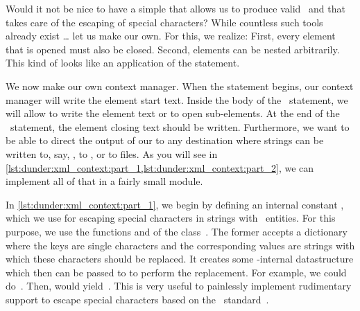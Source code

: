 %
%
%

Would it not be nice to have a simple  that allows us to produce valid~ and that takes care of the escaping of special characters?
While countless such tools already exist {\dots} let us make our own.
For this, we realize:
First, every  element that is opened must also be closed.
Second,  elements can be nested arbitrarily.
This kind of looks like an application of the  statement.

We now make our own context manager.
When the  statement begins, our context manager will write the element start text.
Inside the body of the ~statement, we will allow to write the element text or to open sub-elements.
At the end of the ~statement, the  element closing text should be written.
Furthermore, we want to be able to direct the output of our  to any destination where strings can be written to, say, , to , or to files.
As you will see in \cref{lst:dunder:xml_context:part_1,lst:dunder:xml_context:part_2}, we can implement all of that in a fairly small module.

In \cref{lst:dunder:xml_context:part_1}, we begin by defining an internal constant , which we use for  escaping special characters in strings with ~entities.
For this purpose, we use the functions  and  of the class~.
The former accepts a dictionary where the keys are single characters and the corresponding values are strings with which these characters should be replaced.
It creates some \python-internal datastructure which then can be passed to  to perform the replacement.
For example, we could do~.
Then,  would yield~.
This is very useful to painlessly implement rudimentary support to escape special characters based on the ~standard~\cite{BPSMM2008EMLX1FE}.

